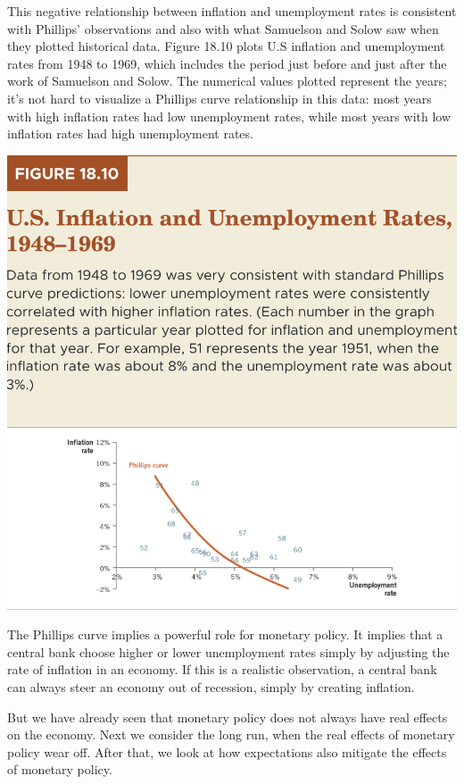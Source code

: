 \documentclass[11pt]{article} %
\begin{document}
This negative relationship between inflation and unemployment rates is consistent with Phillips' observations and also with what Samuelson and Solow saw when they plotted historical data. Figure 18.10 plots U.S inflation and unemployment rates from 1948 to 1969, which includes the period just before and just after the work of Samuelson and Solow. The numerical values plotted represent the years; it's not hard to visualize a Phillips curve relationship in this data: most years with high inflation rates had low unemployment rates, while most years with low inflation rates had high unemployment rates.
\begin{center}
\includegraphics[scale=0.5]{images/Figure 18.10.png}
\end{center}
The Phillips curve implies a powerful role for monetary policy. It implies that a central bank choose higher or lower unemployment rates simply by adjusting the rate of inflation in an economy. If this is a realistic observation, a central bank can always steer an economy out of recession, simply by creating inflation.

But we have already seen that monetary policy does not always have real effects on the economy. Next we consider the long run, when the real effects of monetary policy wear off. After that, we look at how expectations also mitigate the effects of monetary policy.
\end{document}

